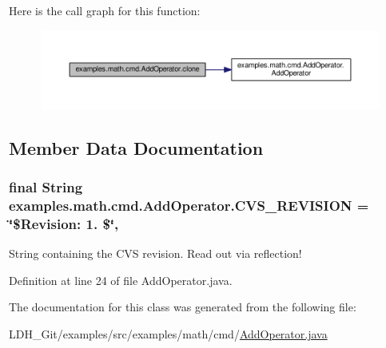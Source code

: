 Here is the call graph for this function\-:
\nopagebreak
\begin{figure}[H]
\begin{center}
\leavevmode
\includegraphics[width=350pt]{classexamples_1_1math_1_1cmd_1_1_add_operator_ad929bb2675ec30f20015f51c82f92569_cgraph}
\end{center}
\end{figure}




\subsection{Member Data Documentation}
\hypertarget{classexamples_1_1math_1_1cmd_1_1_add_operator_a99850a210d2150a17fe5fd32e4bbc286}{
\subsubsection[{C\-V\-S\-\_\-\-R\-E\-V\-I\-S\-I\-O\-N}]{\setlength{\rightskip}{0pt plus 5cm}final String examples.\-math.\-cmd.\-Add\-Operator.\-C\-V\-S\-\_\-\-R\-E\-V\-I\-S\-I\-O\-N = \char`\"{}\$Revision\-: 1. \$\char`\"{}\hspace{0.3cm}{\ttfamily [static]}, {\ttfamily [private]}}}\label{classexamples_1_1math_1_1cmd_1_1_add_operator_a99850a210d2150a17fe5fd32e4bbc286}
String containing the C\-V\-S revision. Read out via reflection! 

Definition at line 24 of file Add\-Operator.\-java.



The documentation for this class was generated from the following file\-:\begin{DoxyCompactItemize}
\item 
L\-D\-H\-\_\-\-Git/examples/src/examples/math/cmd/\hyperlink{_add_operator_8java}{Add\-Operator.\-java}\end{DoxyCompactItemize}
